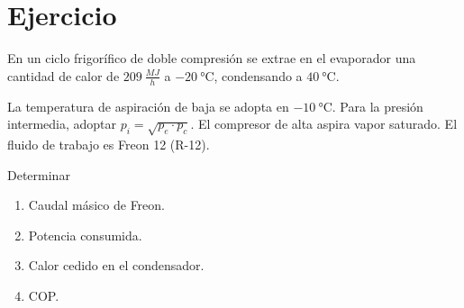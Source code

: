 \section{Ejercicio}\label{ej:Chap11Ejercicio14}
En un ciclo frigorífico de doble compresión se extrae en el evaporador una
cantidad de calor de $\SI{209}{\frac{MJ}{h}}$ a $\SI{-20}{\celsius}$, condensando a $\SI{40}{\celsius}$.

La temperatura de aspiración de baja se adopta en $\SI{-10}{\celsius}$. Para la presión intermedia, adoptar $p_i=\sqrt{p_e \cdot p_c}$. El compresor de alta aspira vapor saturado. El fluido de trabajo es Freon 12 (R-12).

Determinar
\begin{enumerate}
    \item Caudal másico de Freon.
    \item Potencia consumida.
    \item Calor cedido en el condensador.
    \item COP.
\end{enumerate}
